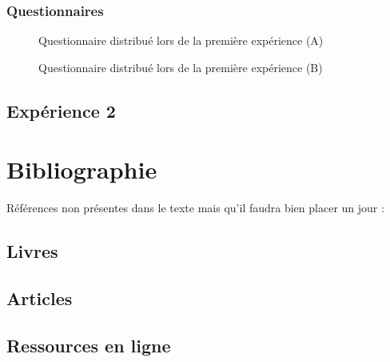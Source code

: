 \documentclass[12pt,fleqn,oneside,openany,]{book} %
\begin{document}
\newpage
\subsection*{Questionnaires} \label{sec:Questionnaires}
\begin{figure}[htp] 
	\caption{Questionnaire distribué lors de la première expérience (A)}
\end{figure}

\newpage
\begin{figure}[htp] 
	\caption{Questionnaire distribué lors de la première expérience (B)}
\end{figure}

\newpage
\section*{Expérience 2}



\chapter{Bibliographie}
\begin{remark}
	Références non présentes dans le texte mais qu'il faudra bien placer un jour : \cite{ref1} \cite{vidnul} \cite{vidcool} \cite{imgtitre} \cite{imgheader1}
\end{remark}
\section*{Livres}
\printbibliography[heading=bibempty,type=book]
\section*{Articles}
\printbibliography[heading=bibempty,type=article]
\section*{Ressources en ligne}
\printbibliography[heading=bibempty,type=online]

\end{document}
